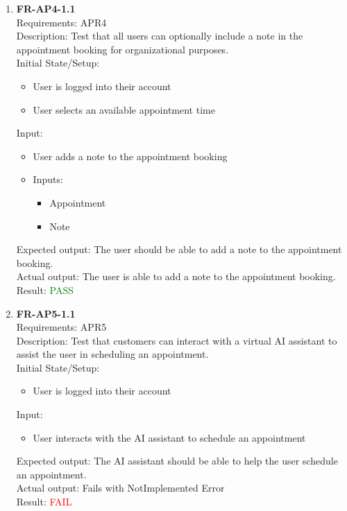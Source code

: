 \documentclass[12pt, titlepage]{article}
\newcommand{\testpass}{\textcolor{green}{PASS}}
\newcommand{\testfail}{\textcolor{red}{FAIL}}
\begin{document}
\begin{enumerate}
                    
                \item \textbf{FR-AP4-1.1} \label{FR-AP4-1.1} \\ Requirements: APR4 \\
                    Description: Test that all users can optionally include a note in the appointment booking for organizational purposes. \\
                    Initial State/Setup: \begin{itemize}
                        \item User is logged into their account
                        \item User selects an available appointment time
                    \end{itemize}
                    Input: \begin{itemize}
                        \item User adds a note to the appointment booking
                        \item Inputs: \begin{itemize}
                            \item Appointment
                            \item Note
                        \end{itemize}
                    \end{itemize}
                    Expected output: The user should be able to add a note to the appointment booking. \\
                    Actual output: The user is able to add a note to the appointment booking. \\
                    Result: \testpass
                    
                    
                \item \textbf{FR-AP5-1.1} \label{FR-AP5-1.1} \\ Requirements: APR5 \\
                    Description: Test that customers can interact with a virtual AI assistant to assist the user in scheduling an appointment. \\
                    Initial State/Setup: \begin{itemize}
                        \item User is logged into their account
                    \end{itemize}
                    Input: \begin{itemize}
                        \item User interacts with the AI assistant to schedule an appointment
                    \end{itemize}
                    Expected output: The AI assistant should be able to help the user schedule an appointment. \\
                    Actual output: Fails with NotImplemented Error \\
                    Result: \testfail
                    \end{enumerate}
\end{document}

